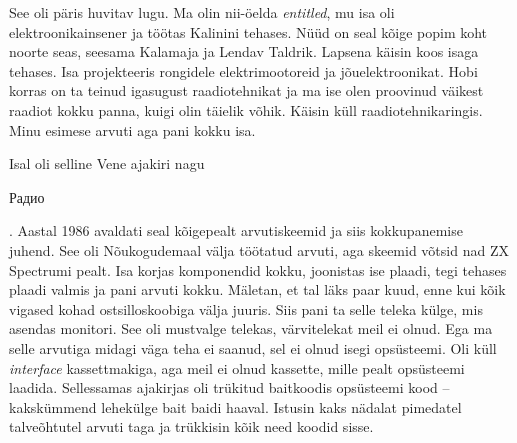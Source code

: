 

See oli päris huvitav lugu. Ma olin nii-öelda \emph{entitled}, mu isa oli
elektroonikainsener ja töötas Kalinini tehases. Nüüd on seal kõige popim koht noorte seas, seesama Kalamaja ja Lendav Taldrik.
Lapsena käisin koos isaga tehases. Isa projekteeris rongidele
elektrimootoreid ja jõuelektroonikat. 
Hobi korras on ta teinud igasugust raadiotehnikat ja ma ise olen proovinud
väikest raadiot kokku panna, kuigi olin täielik võhik. Käisin küll raadiotehnikaringis. Minu esimese arvuti aga pani kokku isa.


Isal oli selline Vene ajakiri nagu 
\begin{russian}Радио\end{russian}. Aastal 1986 avaldati seal 
kõigepealt arvutiskeemid ja siis kokkupanemise juhend. See oli 
Nõukogudemaal välja töötatud arvuti, aga skeemid võtsid nad ZX Spectrumi 
pealt. Isa korjas komponendid kokku, 
joonistas ise plaadi, tegi tehases plaadi valmis ja 
pani arvuti kokku. Mäletan, et tal läks paar kuud, enne kui kõik 
vigased kohad ostsilloskoobiga välja juuris. Siis pani ta selle 
teleka külge, mis asendas monitori. See oli mustvalge telekas, 
värvitelekat meil ei olnud. Ega ma selle arvutiga midagi väga teha ei 
saanud, sel ei olnud isegi opsüsteemi. Oli küll \emph{interface} 
kassettmakiga, aga meil ei olnud kassette, mille pealt 
opsüsteemi laadida. Sellessamas ajakirjas oli trükitud baitkoodis opsüsteemi kood – 
kakskümmend lehekülge bait baidi haaval. Istusin kaks nädalat pimedatel talveõhtutel arvuti taga 
ja trükkisin kõik need koodid sisse.

